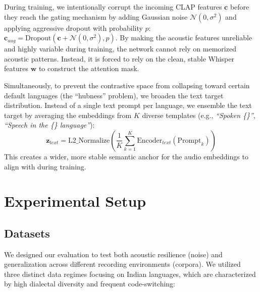\documentclass[conference]{IEEEtran}
\begin{document}
During training, we intentionally corrupt the incoming CLAP features $\mathbf{c}$ before they reach the gating mechanism by adding Gaussian noise $\mathcal{N}(0, \sigma^2)$ and applying aggressive dropout with probability $p$: $\mathbf{c}_{aug} = \text{Dropout}(\mathbf{c} + \mathcal{N}(0, \sigma^2), p)$. By making the acoustic features unreliable and highly variable during training, the network cannot rely on memorized acoustic patterns. Instead, it is forced to rely on the clean, stable Whisper features $\mathbf{w}$ to construct the attention mask. 

Simultaneously, to prevent the contrastive space from collapsing toward certain default languages (the ``hubness'' problem), we broaden the text target distribution. Instead of a single text prompt per language, we ensemble the text target by averaging the embeddings from $K$ diverse templates (e.g., \textit{``Spoken \{\}''}, \textit{``Speech in the \{\} language''}):
\begin{equation}
    \mathbf{z}_{text} = \text{L2\_Normalize}\left(\frac{1}{K} \sum_{k=1}^{K} \text{Encoder}_{text}(\text{Prompt}_k)\right)
\end{equation}
This creates a wider, more stable semantic anchor for the audio embeddings to align with during training.

\section{Experimental Setup}

\subsection{Datasets}
We designed our evaluation to test both acoustic resilience (noise) and generalization across different recording environments (corpora). We utilized three distinct data regimes focusing on Indian languages, which are characterized by high dialectal diversity and frequent code-switching:
\end{document}
